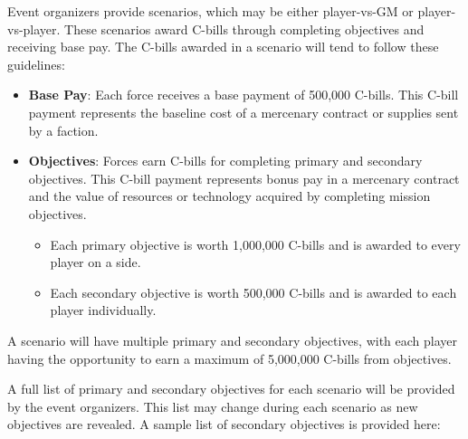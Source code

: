 Event organizers provide scenarios, which may be either player-vs-GM or player-vs-player.
These scenarios award C-bills through completing objectives and receiving base pay.
The C-bills awarded in a scenario will tend to follow these guidelines:

\begin{itemize}

\item {\bfseries Base Pay}: Each force receives a base payment of 500,000 C-bills.
This C-bill payment represents the baseline cost of a mercenary contract or supplies sent by a faction.

\item {\bfseries Objectives}: Forces earn C-bills for completing primary and secondary objectives.
This C-bill payment represents bonus pay in a mercenary contract and the value of resources or technology acquired by completing mission objectives.

\begin{itemize}

\item Each primary objective is worth 1,000,000 C-bills and is awarded to every player on a side.

\item Each secondary objective is worth 500,000 C-bills and is awarded to each player individually.

\end{itemize}

\end{itemize}

A scenario will have multiple primary and secondary objectives, with each player having the opportunity to earn a maximum of 5,000,000 C-bills from objectives.

A full list of primary and secondary objectives for each scenario will be provided by the event organizers.
This list may change during each scenario as new objectives are revealed.
A sample list of secondary objectives is provided here:

